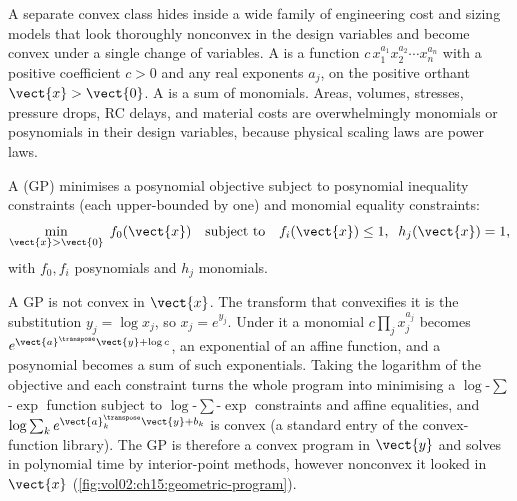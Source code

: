 A separate convex class hides inside a wide family of engineering cost
and sizing models that look thoroughly nonconvex in the design
variables and become convex under a single change of variables. A
 is a function $c\, x_{1}^{a_{1}} x_{2}^{a_{2}} \cdots
x_{n}^{a_{n}}$ with a positive coefficient $c > 0$ and any real
exponents $a_{j}$, on the positive orthant $\vect{x} > \vect{0}$. A
 is a sum of monomials. Areas, volumes, stresses,
pressure drops, RC delays, and material costs are overwhelmingly
monomials or posynomials in their design variables, because physical
scaling laws are power laws.

\begin{definition}
A  (GP) minimises a posynomial objective
subject to posynomial inequality constraints (each upper-bounded by
one) and monomial equality constraints:
\[
\min_{\vect{x} > \vect{0}} \; f_{0}(\vect{x})
\quad \text{subject to} \quad
f_{i}(\vect{x}) \leq 1, \;\; h_{j}(\vect{x}) = 1,
\]
with $f_{0}, f_{i}$ posynomials and $h_{j}$ monomials.
\end{definition}

A GP is not convex in $\vect{x}$. The transform that convexifies it is
the substitution $y_{j} = \log x_{j}$, so $x_{j} = e^{y_{j}}$. Under it
a monomial $c \prod_{j} x_{j}^{a_{j}}$ becomes $e^{\vect{a}^{\transpose}
\vect{y} + \log c}$, an exponential of an affine function, and a
posynomial becomes a sum of such exponentials. Taking the logarithm of
the objective and each constraint turns the whole program into
minimising a $\log$-$\sum$-$\exp$ function subject to $\log$-$\sum$-$\exp$
constraints and affine equalities, and $\log \sum_{k} e^{\vect{a}_{k}^{
\transpose} \vect{y} + b_{k}}$ is convex (a standard entry of the convex-
function library). The GP is therefore a convex program in $\vect{y}$
and solves in polynomial time by interior-point methods, however
nonconvex it looked in $\vect{x}$ (\cref{fig:vol02:ch15:geometric-program}).

